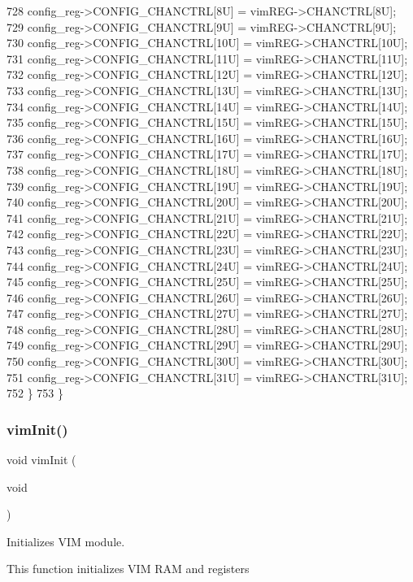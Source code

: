 \begin{DoxyCode}
728         config\_reg->CONFIG\_CHANCTRL[8U] = vimREG->CHANCTRL[8U];
729         config\_reg->CONFIG\_CHANCTRL[9U] = vimREG->CHANCTRL[9U];
730         config\_reg->CONFIG\_CHANCTRL[10U] = vimREG->CHANCTRL[10U];
731         config\_reg->CONFIG\_CHANCTRL[11U] = vimREG->CHANCTRL[11U];
732         config\_reg->CONFIG\_CHANCTRL[12U] = vimREG->CHANCTRL[12U];
733         config\_reg->CONFIG\_CHANCTRL[13U] = vimREG->CHANCTRL[13U];
734         config\_reg->CONFIG\_CHANCTRL[14U] = vimREG->CHANCTRL[14U];
735         config\_reg->CONFIG\_CHANCTRL[15U] = vimREG->CHANCTRL[15U];
736         config\_reg->CONFIG\_CHANCTRL[16U] = vimREG->CHANCTRL[16U];
737         config\_reg->CONFIG\_CHANCTRL[17U] = vimREG->CHANCTRL[17U];
738         config\_reg->CONFIG\_CHANCTRL[18U] = vimREG->CHANCTRL[18U];
739         config\_reg->CONFIG\_CHANCTRL[19U] = vimREG->CHANCTRL[19U];
740         config\_reg->CONFIG\_CHANCTRL[20U] = vimREG->CHANCTRL[20U];
741         config\_reg->CONFIG\_CHANCTRL[21U] = vimREG->CHANCTRL[21U];
742         config\_reg->CONFIG\_CHANCTRL[22U] = vimREG->CHANCTRL[22U];
743         config\_reg->CONFIG\_CHANCTRL[23U] = vimREG->CHANCTRL[23U];
744         config\_reg->CONFIG\_CHANCTRL[24U] = vimREG->CHANCTRL[24U];
745         config\_reg->CONFIG\_CHANCTRL[25U] = vimREG->CHANCTRL[25U];
746         config\_reg->CONFIG\_CHANCTRL[26U] = vimREG->CHANCTRL[26U];
747         config\_reg->CONFIG\_CHANCTRL[27U] = vimREG->CHANCTRL[27U];
748         config\_reg->CONFIG\_CHANCTRL[28U] = vimREG->CHANCTRL[28U];
749         config\_reg->CONFIG\_CHANCTRL[29U] = vimREG->CHANCTRL[29U];
750         config\_reg->CONFIG\_CHANCTRL[30U] = vimREG->CHANCTRL[30U];
751         config\_reg->CONFIG\_CHANCTRL[31U] = vimREG->CHANCTRL[31U];
752     \}
753 \}
\end{DoxyCode}
\mbox{\label{group__VIM_ga894b6f212b72787bfa97f1ac62877167}} 
\subsubsection{\texorpdfstring{vim\+Init()}{vimInit()}}
{\footnotesize\ttfamily void vim\+Init (\begin{DoxyParamCaption}\item[{void}]{ }\end{DoxyParamCaption})}



Initializes V\+IM module. 

This function initializes V\+IM R\+AM and registers 

